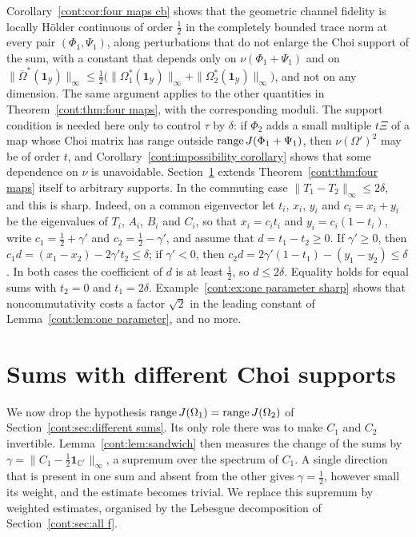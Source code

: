 \begin{remark}
Corollary~\ref{cont:cor:four maps cb} shows that the geometric channel fidelity is locally H\"older continuous of order $\frac12$ in the completely bounded trace norm at every pair $(\Phi_1,\Psi_1)$, along perturbations that do not enlarge the Choi support of the sum, with a constant that depends only on $\nu(\Phi_1+\Psi_1)$ and on $\|\overline{\Omega}^*(\mathbf{1}_{\mathcal{Y}})\|_\infty\leq\frac12\big(\|\Omega_1^*(\mathbf{1}_{\mathcal{Y}})\|_\infty+\|\Omega_2^*(\mathbf{1}_{\mathcal{Y}})\|_\infty\big)$, and not on any dimension. The same argument applies to the other quantities in Theorem~\ref{cont:thm:four maps}, with the corresponding moduli. The support condition is needed here only to control $\tau$ by $\delta$: if $\Phi_2$ adds a small multiple $t\Xi$ of a map whose Choi matrix has range outside $\operatorname{range} J(\Phi_1+\Psi_1)$, then $\nu(\Omega')^2$ may be of order $t$, and Corollary~\ref{cont:impossibility corollary} shows that some dependence on $\nu$ is unavoidable. Section~\ref{cont:sec:different supports} extends Theorem~\ref{cont:thm:four maps} itself to arbitrary supports. In the commuting case $\|T_1-T_2\|_\infty\leq2\delta$, and this is sharp. Indeed, on a common eigenvector let $t_i$, $x_i$, $y_i$ and $c_i=x_i+y_i$ be the eigenvalues of $T_i$, $A_i$, $B_i$ and $C_i$, so that $x_i=c_it_i$ and $y_i=c_i(1-t_i)$, write $c_1=\frac12+\gamma'$ and $c_2=\frac12-\gamma'$, and assume that $d=t_1-t_2\geq0$. If $\gamma'\geq0$, then $c_1d=(x_1-x_2)-2\gamma't_2\leq\delta$; if $\gamma'<0$, then $c_2d=2\gamma'(1-t_1)-(y_1-y_2)\leq\delta$. In both cases the coefficient of $d$ is at least $\frac12$, so $d\leq2\delta$. Equality holds for equal sums with $t_2=0$ and $t_1=2\delta$. Example~\ref{cont:ex:one parameter sharp} shows that noncommutativity costs a factor $\sqrt2$ in the leading constant of Lemma~\ref{cont:lem:one parameter}, and no more.
\end{remark}

\section{Sums with different Choi supports}\label{cont:sec:different supports}

We now drop the hypothesis $\operatorname{range} J(\Omega_1)=\operatorname{range} J(\Omega_2)$ of Section~\ref{cont:sec:different sums}. Its only role there was to make $C_1$ and $C_2$ invertible. Lemma~\ref{cont:lem:sandwich} then measures the change of the sums by $\gamma=\|C_1-\frac12\mathbf{1}_{\mathbb{C}^r}\|_\infty$, a supremum over the spectrum of $C_1$. A single direction that is present in one sum and absent from the other gives $\gamma=\frac12$, however small its weight, and the estimate becomes trivial. We replace this supremum by weighted estimates, organised by the Lebesgue decomposition of Section~\ref{cont:sec:all f}.


